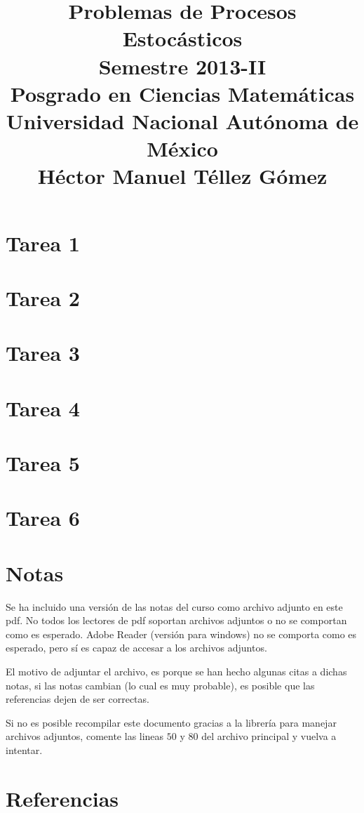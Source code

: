 \documentclass[a5paper,oneside]{amsart}
\title[Tarea de procesos estocásticos 2013-2]{
    Problemas de Procesos Estocásticos\\ 
    Semestre 2013-II\\ 
    Posgrado en Ciencias Matemáticas\\ 
    Universidad Nacional Autónoma de México\\
    Héctor Manuel Téllez Gómez
}
\theoremstyle{definition}
\numberwithin{section}{part}
\numberwithin{equation}{subsection}
\begin{document}
    \maketitle
    \part{Tarea 1}
                
        \nqed
        
    \part{Tarea 2}
                
        \nqed
        
    \part{Tarea 3}
                
        \nqed
            
    \part{Tarea 4}
                
        \nqed    
    
    \part{Tarea 5}
                
        \nqed
    
    \part{Tarea 6}
                
        \nqed
    
    \part*{Notas}\label{notas}
        Se ha incluido una versión de las notas del curso como archivo adjunto en este pdf. No todos los lectores de pdf soportan archivos 
        adjuntos o no se comportan como es esperado. Adobe Reader (versión para windows) no se comporta como es esperado, pero sí es capaz de accesar a los
        archivos adjuntos.\pn
        
        El motivo de adjuntar el archivo, es porque se han hecho algunas citas a dichas notas, si las notas cambian (lo cual es muy probable), 
        es posible que las referencias dejen de ser correctas.\pn
        
        Si no es posible recompilar este documento gracias a la librería para manejar archivos adjuntos, comente las lineas $50$ y $80$ del archivo principal y 
        vuelva a intentar. 
    \newpage
    
    \part*{Referencias}
        
        
\end{document}
